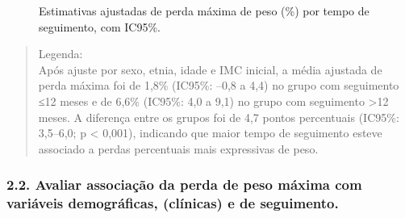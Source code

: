 \documentclass[
]{article}
\begin{document}
\begin{figure}[H]


\caption{\label{fig-perda-maxima-ajustada}Estimativas ajustadas de perda
máxima de peso (\%) por tempo de seguimento, com IC95\%.}

\end{figure}%

\begin{quote}
Legenda:\\
Após ajuste por sexo, etnia, idade e IMC inicial, a média ajustada de
perda máxima foi de 1,8\% (IC95\%: --0,8 a 4,4) no grupo com seguimento
≤12 meses e de 6,6\% (IC95\%: 4,0 a 9,1) no grupo com seguimento
\textgreater12 meses. A diferença entre os grupos foi de 4,7 pontos
percentuais (IC95\%: 3,5--6,0; p \textless{} 0,001), indicando que maior
tempo de seguimento esteve associado a perdas percentuais mais
expressivas de peso.
\end{quote}

\subsubsection{2.2. Avaliar associação da perda de peso máxima com
variáveis demográficas, (clínicas) e de
seguimento.}\label{avaliar-associauxe7uxe3o-da-perda-de-peso-muxe1xima-com-variuxe1veis-demogruxe1ficas-cluxednicas-e-de-seguimento.}
\end{document}
